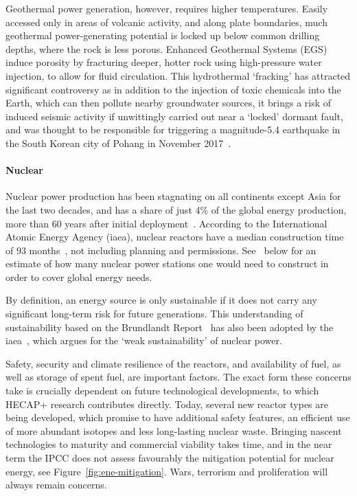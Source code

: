 \documentclass[../SustainableHEP.tex]{subfiles}
\begin{document}
Geothermal power generation, however, requires higher temperatures.  Easily accessed only in areas of volcanic activity, and along plate boundaries, much geothermal power-generating potential is locked up below common drilling depths, where the rock is less porous.  Enhanced Geothermal Systems (EGS)~\cite{IRENA2017} induce porosity by fracturing deeper, hotter rock using high-pressure water injection, to allow for fluid circulation.  This hydrothermal `fracking' has attracted significant controversy as in addition to the injection of toxic chemicals into the Earth, which can then pollute nearby groundwater sources, it brings a risk of induced seismic activity if unwittingly carried out near a `locked' dormant fault, and was thought to be responsible for triggering a magnitude-5.4 earthquake in the South Korean city of Pohang in November 2017~\cite{Kim2018,Grigoli2018}. 

\paragraph{Nuclear}

Nuclear power production has been stagnating on all continents except Asia for the last two decades, and has a share of just 4\% of the global energy production, more than 60 years after initial deployment~\cite{OWDnuclear}. According to the International Atomic Energy Agency (\acrshort{iaea}), nuclear reactors have a median construction time of 93 months~\cite{IAEANuclear}, not including planning and permissions.  See~ below for an estimate of how many nuclear power stations one would need to construct in order to cover global energy needs. 
 
By definition, an energy source is only sustainable if it does not carry any significant long-term risk for future generations. This understanding of sustainability based on the Brundlandt Report~\cite{Brundtland} has also been adopted by the \acrshort{iaea}~\cite{IAEA}, which argues for the `weak sustainability' of nuclear power.

Safety, security and climate resilience of the reactors, and availability of fuel, as well as storage of spent fuel, are important factors.
The exact form these concerns take is crucially dependent on future technological developments, to which HECAP+ research contributes directly. Today, several new reactor types are being developed, which promise to have additional safety features, an efficient use of more abundant isotopes and less long-lasting nuclear waste.  Bringing nascent technologies to maturity and commercial viability takes time, and in the near term the IPCC does not assess favourably the mitigation potential for nuclear energy, see Figure~\ref{fig:ene-mitigation}.  Wars, terrorism and proliferation will always remain concerns.
\end{document}

